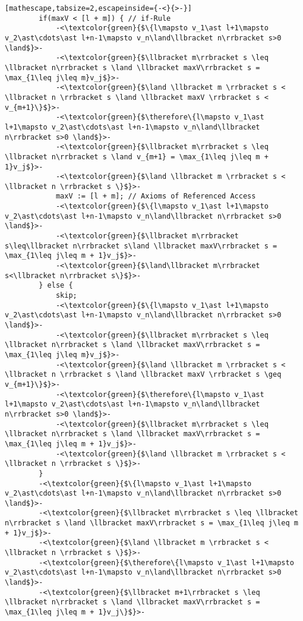 \begin{myexp}
\begin{lstlisting}[mathescape,tabsize=2,escapeinside={-<}{>-}]
		if(maxV < [l + m]) { // if-Rule
			-<\textcolor{green}{$\{l\mapsto v_1\ast l+1\mapsto v_2\ast\cdots\ast l+n-1\mapsto v_n\land\llbracket n\rrbracket s>0 \land$}>-
			-<\textcolor{green}{$\llbracket m\rrbracket s \leq \llbracket n\rrbracket s \land \llbracket maxV\rrbracket s = \max_{1\leq j\leq m}v_j$}>-
			-<\textcolor{green}{$\land \llbracket m \rrbracket s < \llbracket n \rrbracket s \land \llbracket maxV \rrbracket s < v_{m+1}\}$}>-
			-<\textcolor{green}{$\therefore\{l\mapsto v_1\ast l+1\mapsto v_2\ast\cdots\ast l+n-1\mapsto v_n\land\llbracket n\rrbracket s>0 \land$}>-
			-<\textcolor{green}{$\llbracket m\rrbracket s \leq \llbracket n\rrbracket s \land v_{m+1} = \max_{1\leq j\leq m + 1}v_j$}>-
			-<\textcolor{green}{$\land \llbracket m \rrbracket s < \llbracket n \rrbracket s \}$}>-
			maxV := [l + m]; // Axioms of Referenced Access
			-<\textcolor{green}{$\{l\mapsto v_1\ast l+1\mapsto v_2\ast\cdots\ast l+n-1\mapsto v_n\land\llbracket n\rrbracket s>0 \land$}>-
			-<\textcolor{green}{$\llbracket m\rrbracket s\leq\llbracket n\rrbracket s\land \llbracket maxV\rrbracket s = \max_{1\leq j\leq m + 1}v_j$}>-
			-<\textcolor{green}{$\land\llbracket m\rrbracket s<\llbracket n\rrbracket s\}$}>-
		} else {
			skip;
			-<\textcolor{green}{$\{l\mapsto v_1\ast l+1\mapsto v_2\ast\cdots\ast l+n-1\mapsto v_n\land\llbracket n\rrbracket s>0 \land$}>-
			-<\textcolor{green}{$\llbracket m\rrbracket s \leq \llbracket n\rrbracket s \land \llbracket maxV\rrbracket s = \max_{1\leq j\leq m}v_j$}>-
			-<\textcolor{green}{$\land \llbracket m \rrbracket s < \llbracket n \rrbracket s \land \llbracket maxV \rrbracket s \geq v_{m+1}\}$}>-
			-<\textcolor{green}{$\therefore\{l\mapsto v_1\ast l+1\mapsto v_2\ast\cdots\ast l+n-1\mapsto v_n\land\llbracket n\rrbracket s>0 \land$}>-
			-<\textcolor{green}{$\llbracket m\rrbracket s \leq \llbracket n\rrbracket s \land \llbracket maxV\rrbracket s = \max_{1\leq j\leq m + 1}v_j$}>-
			-<\textcolor{green}{$\land \llbracket m \rrbracket s < \llbracket n \rrbracket s \}$}>-
		}
		-<\textcolor{green}{$\{l\mapsto v_1\ast l+1\mapsto v_2\ast\cdots\ast l+n-1\mapsto v_n\land\llbracket n\rrbracket s>0 \land$}>-
		-<\textcolor{green}{$\llbracket m\rrbracket s \leq \llbracket n\rrbracket s \land \llbracket maxV\rrbracket s = \max_{1\leq j\leq m + 1}v_j$}>-
		-<\textcolor{green}{$\land \llbracket m \rrbracket s < \llbracket n \rrbracket s \}$}>-
		-<\textcolor{green}{$\therefore\{l\mapsto v_1\ast l+1\mapsto v_2\ast\cdots\ast l+n-1\mapsto v_n\land\llbracket n\rrbracket s>0 \land$}>-
		-<\textcolor{green}{$\llbracket m+1\rrbracket s \leq \llbracket n\rrbracket s \land \llbracket maxV\rrbracket s = \max_{1\leq j\leq m + 1}v_j\}$}>-

\end{lstlisting}
\end{myexp}
